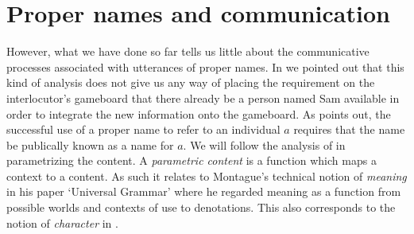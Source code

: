 \section{Proper names and communication}

However, what we have done so far tells us little about the
communicative processes associated with utterances of proper names.
In \cite{Cooper2013b} we pointed out that this kind of analysis does not give us any way of placing the requirement
on the interlocutor's gameboard that there already be a person named
Sam available in order to integrate the new information onto the
gameboard.  As \cite{Ginzburg2012} points out, the successful use
of a proper name to refer to an individual $a$ requires that the name
be publically known as a name for $a$.  We will follow the analysis of
\cite{Cooper2013b} in parametrizing the content.  A
\textit{parametric content} is a function which maps a context to a
content.  As such it relates to Montague's technical notion of
  \textit{meaning} in his paper `Universal Grammar'
  \citep{Montague1970,Montague1974} where he regarded meaning as a
  function from possible worlds and contexts of use to denotations.
  This also corresponds to the notion of \textit{character} in
  \cite{Kaplan1978}.


